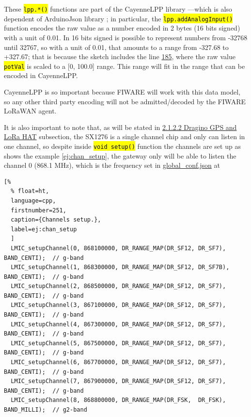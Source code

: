 \documentclass[11pt,a4paper,dvipsnames,twoside]{article}
\newcommand{\cmd}[1] {\hl{\texttt{#1}}}
\begin{document}
These \cmd{lpp.*()} functions are part of the CayenneLPP library \cite{CayenneLPP_lib} ---which is also dependent of ArduinoJson library \cite{ArduinoJson_lib}; in particular, the \cmd{lpp.addAnalogInput()} function encodes the raw value as a number encoded in 2 bytes (16 bits signed) with a unit of 0.01. In 16 bits signed is possible to represent numbers from -32768 until 32767, so with a unit of 0.01, that amounts to a range from -327.68 to +327.67; that is because the sketch includes the line \href{https://github.com/WyRe/lora-arduino-dendrometer/blob/master/src/arduino/dendro/dendro.ino#L185}{185}, where the raw value \cmd{potVal} is scaled to a [0, 100.0] range. This range will fit in the range that can be encoded in CayenneLPP. 

CayenneLPP is so important because FIWARE will work with this data model, so any other third party encoding will not be admitted/decoded by the FIWARE LoRaWAN agent.

It is also important to note that, as will be stated in \hyperlink{Raspi_HAT}{2.1.2.2 Dragino GPS and LoRa HAT} subsection, the SX1276 is a single channel chip and only can listen in one channel, so despite inside \cmd{void setup()} function the channels are set up as shows the example \ref{ej:chan_setup}, the gateway only will be able to listen the channel 0 (868.1 \si{\mega\hertz}), which is the frequency set in \href{https://github.com/dragino/dual_chan_pkt_fwd/blob/master/global_conf.json}{global\_conf.json} at \cite{Dragino_DualChannelController_Rpi}

\begin{lstlisting}[%
  % float=ht,
  language=cpp,
  firstnumber=251,
  caption={Channels setup.},
  label=ej:chan_setup
  ]
  LMIC_setupChannel(0, 868100000, DR_RANGE_MAP(DR_SF12, DR_SF7),  BAND_CENTI);  // g-band
  LMIC_setupChannel(1, 868300000, DR_RANGE_MAP(DR_SF12, DR_SF7B), BAND_CENTI);  // g-band
  LMIC_setupChannel(2, 868500000, DR_RANGE_MAP(DR_SF12, DR_SF7),  BAND_CENTI);  // g-band
  LMIC_setupChannel(3, 867100000, DR_RANGE_MAP(DR_SF12, DR_SF7),  BAND_CENTI);  // g-band
  LMIC_setupChannel(4, 867300000, DR_RANGE_MAP(DR_SF12, DR_SF7),  BAND_CENTI);  // g-band
  LMIC_setupChannel(5, 867500000, DR_RANGE_MAP(DR_SF12, DR_SF7),  BAND_CENTI);  // g-band
  LMIC_setupChannel(6, 867700000, DR_RANGE_MAP(DR_SF12, DR_SF7),  BAND_CENTI);  // g-band
  LMIC_setupChannel(7, 867900000, DR_RANGE_MAP(DR_SF12, DR_SF7),  BAND_CENTI);  // g-band
  LMIC_setupChannel(8, 868800000, DR_RANGE_MAP(DR_FSK,  DR_FSK),  BAND_MILLI);  // g2-band
\end{lstlisting}
\end{document}
